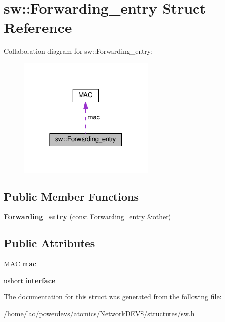\hypertarget{structsw_1_1Forwarding__entry}{}\section{sw\+:\+:Forwarding\+\_\+entry Struct Reference}
\label{structsw_1_1Forwarding__entry}


Collaboration diagram for sw\+:\+:Forwarding\+\_\+entry\+:
\nopagebreak
\begin{figure}[H]
\begin{center}
\leavevmode
\includegraphics[width=190pt]{structsw_1_1Forwarding__entry__coll__graph}
\end{center}
\end{figure}
\subsection*{Public Member Functions}
\begin{DoxyCompactItemize}
\item 
{\bfseries Forwarding\+\_\+entry} (const \hyperlink{structsw_1_1Forwarding__entry}{Forwarding\+\_\+entry} \&other)\hypertarget{structsw_1_1Forwarding__entry_a504b52199970b085a23a28cd45b9b788}{}\label{structsw_1_1Forwarding__entry_a504b52199970b085a23a28cd45b9b788}

\end{DoxyCompactItemize}
\subsection*{Public Attributes}
\begin{DoxyCompactItemize}
\item 
\hyperlink{structMAC}{M\+AC} {\bfseries mac}\hypertarget{structsw_1_1Forwarding__entry_a69db303ecdfc75db66ea09b459ace6fc}{}\label{structsw_1_1Forwarding__entry_a69db303ecdfc75db66ea09b459ace6fc}

\item 
ushort {\bfseries interface}\hypertarget{structsw_1_1Forwarding__entry_ab08b8f0d50af0a13308f5fc5224586d6}{}\label{structsw_1_1Forwarding__entry_ab08b8f0d50af0a13308f5fc5224586d6}

\end{DoxyCompactItemize}


The documentation for this struct was generated from the following file\+:\begin{DoxyCompactItemize}
\item 
/home/lao/powerdevs/atomics/\+Network\+D\+E\+V\+S/structures/sw.\+h\end{DoxyCompactItemize}

